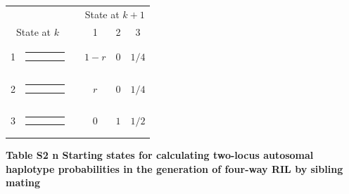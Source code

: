 \documentclass[9pt,letterpaper,twoside]{article}
\begin{document}
{
{ \small \renewcommand{\arraystretch}{1.1}
\begin{center}
\begin{tabular}{cccccc} \hline
 & & &\multicolumn{3}{c}{State at $k+1$} \\
\cline{4-6}
\multicolumn{2}{c}{State at $k$} & 
& 1& 2& 3\\ \hline 
1 &
{\renewcommand{\arraystretch}{0.3}
\renewcommand{\tabcolsep}{0.5mm}
\parbox[b][3mm][c]{12mm}{
\begin{tabular}{|p{2mm}|p{2mm}||p{2mm}|p{2mm}|} \hline
$\bullet$ &           &           &           \\
$\bullet$ &           &           &           \\ \hline
\end{tabular}}}
&
& $1-r$
& $0$
& $1/4$
\\
2 &
{\renewcommand{\arraystretch}{0.3}
\renewcommand{\tabcolsep}{0.5mm}
\parbox[b][3mm][c]{12mm}{
\begin{tabular}{|p{2mm}|p{2mm}||p{2mm}|p{2mm}|} \hline
$\bullet$ &           &           &           \\
          & $\bullet$ &           &           \\ \hline
\end{tabular}}}
&
& $r$
& $0$
& $1/4$
\\
3 &
{\renewcommand{\arraystretch}{0.3}
\renewcommand{\tabcolsep}{0.5mm}
\parbox[b][3mm][c]{12mm}{
\begin{tabular}{|p{2mm}|p{2mm}||p{2mm}|p{2mm}|} \hline
$\bullet$ &           &           &           \\
          &           & $\bullet$ &           \\ \hline
\end{tabular}}}
&
& $0$
& $1$
& $1/2$
\\
\hline
\end{tabular}
\end{center} }
}

\newpage

\noindent \textbf{Table S2 {\color{white} n} Starting states for calculating
two-locus autosomal haplotype probabilities in the generation of four-way RIL by
sibling mating}
\end{document}
